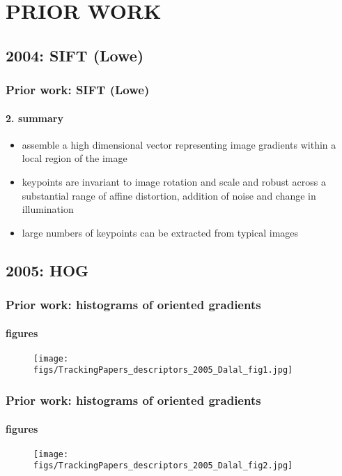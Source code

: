 \section{PRIOR WORK}
\subsection{2004: SIFT (Lowe)}
\begin{frame}
\frametitle{Prior work: SIFT (Lowe)}
\framesubtitle{2. summary}
\mypagenum
{}
	\begin{itemize}
		\item assemble a high dimensional vector representing image gradients within a local region of the image
		\item keypoints are invariant to image rotation and scale and robust across a substantial range of affine distortion, addition of noise and change in illumination
		\item large numbers of keypoints can be extracted from typical images
	\end{itemize}
\end{frame}






\subsection{2005: HOG}
\begin{frame}
\frametitle{Prior work: histograms of oriented gradients}
\framesubtitle{figures}
\mypagenum
{}
	\begin{figure}
		\texttt{[image: figs/TrackingPapers\_descriptors\_2005\_Dalal\_fig1.jpg]}
	\end{figure}
\end{frame}


\begin{frame}
\frametitle{Prior work: histograms of oriented gradients}
\framesubtitle{figures}
\mypagenum
{}
	\begin{figure}
		\texttt{[image: figs/TrackingPapers\_descriptors\_2005\_Dalal\_fig2.jpg]}
	\end{figure}
\end{frame}




